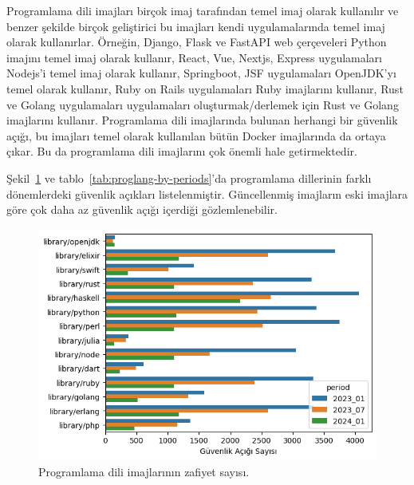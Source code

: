 Programlama dili imajları birçok imaj tarafından temel imaj olarak kullanılır ve benzer şekilde birçok geliştirici bu imajları kendi uygulamalarında temel imaj olarak kullanırlar. Örneğin, Django, Flask ve FastAPI web çerçeveleri Python imajını temel imaj olarak kullanır, React, Vue, Nextjs, Express uygulamaları Nodejs'i temel imaj olarak kullanır, Springboot, JSF uygulamaları OpenJDK'yı temel olarak kullanır, Ruby on Rails uygulamaları Ruby imajlarını kullanır, Rust ve Golang uygulamaları uygulamaları oluşturmak/derlemek için Rust ve Golang imajlarını kullanır. Programlama dili imajlarında bulunan herhangi bir güvenlik açığı, bu imajları temel olarak kullanılan bütün Docker imajlarında da ortaya çıkar. Bu da programlama dili imajlarını çok önemli hale getirmektedir.

Şekil~\ref{fig:proglang-by-periods} ve tablo~\ref{tab:proglang-by-periods}'da programlama dillerinin farklı dönemlerdeki güvenlik açıkları listelenmiştir. Güncellenmiş imajların eski imajlara göre çok daha az güvenlik açığı içerdiği gözlemlenebilir.

\begin{figure}[!htbp]
    \centering
    \includegraphics[width=1\linewidth]{images/s2/proglang-by-periods.png}
    \caption{Programlama dili imajlarının zafiyet sayısı.}\label{fig:proglang-by-periods}
\end{figure}

